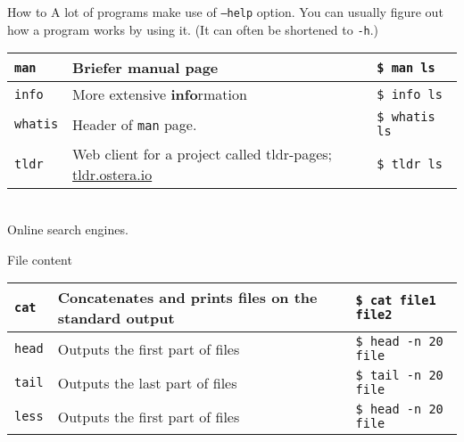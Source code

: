 \documentclass{beamer}
\let\tt\texttt
\let\bf\textbf
\begin{document}
\begin{frame}{How to}
        A lot of programs make use of \tt{--help} option. You can usually figure out how a program works by using it. (It can often be shortened to \tt{-h}.)
        \begin{tabular}{p{} p{} | p{}}
                \hline
                \tt{man}                    &
                Briefer \bf{man}ual page    &
                \tt{\$ man ls}              \\
                \hline
                \tt{info}                           &
                More extensive \bf{info}rmation    &
                \tt{\$ info ls}                     \\
                \hline
                \tt{whatis}                         &
                Header of \tt{man} page.            &
                \tt{\$ whatis ls}                   \\
                \hline
                \tt{tldr}             &
                Web client for a project called tldr-pages; 
                \url{tldr.ostera.io} &
                \tt{\$ tldr ls}       \\
                \hline
        \end{tabular}   \\
        Online search engines.
\end{frame}

\begin{frame}{File content}
        \begin{tabular}{p{} p{} | p{}}
                \hline
                \tt{cat}             &
                Concatenates and prints files on the standard output &
                \tt{\$ cat file1 file2}       \\
                \hline
                \tt{head}             &
                Outputs the first part of files &
                \tt{\$ head -n 20 file}       \\
                \hline
                \tt{tail}             &
                Outputs the last part of files &
                \tt{\$ tail -n 20 file}       \\
                \hline
                \tt{less}             &
                Outputs the first part of files &
                \tt{\$ head -n 20 file}       \\
                \hline
        \end{tabular}  
\end{frame}
\end{document}
